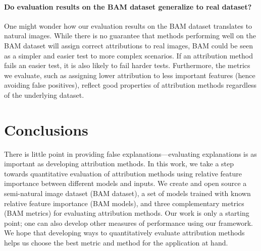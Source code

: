 \documentclass[twoside]{article}
\begin{document}
\paragraph{Do evaluation results on the BAM dataset generalize to real dataset?}
One might wonder how our evaluation results on the BAM dataset translates to natural images. While there is no guarantee that methods performing well on the BAM dataset will assign correct attributions to real images, BAM could be seen as a simpler and easier test to more complex scenarios. If an attribution method fails an easier test, it is also likely to fail harder tests.
Furthermore, the metrics we evaluate, such as assigning lower attribution to less important features (hence avoiding false positives), reflect good properties of attribution methods regardless of the underlying dataset.

\section{Conclusions}
There is little point in providing false explanations---evaluating explanations is as important as developing attribution methods. In this work, we take a step towards quantitative evaluation of attribution methods using relative feature importance between different models and inputs. We create and open source a semi-natural image dataset (BAM dataset), a set of models trained with known relative feature importance (BAM models), and three complementary metrics (BAM metrics) for evaluating attribution methods. Our work is only a starting point; one can also develop other measures of performance using our framework. We hope that developing ways to quantitatively evaluate attribution methods helps us choose the best metric and method for the application at hand.

\clearpage



\clearpage
\appendix

\end{document}
